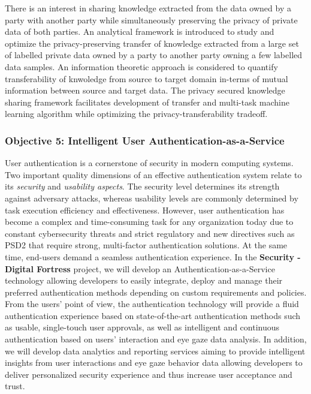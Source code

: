 \documentclass[a4paper,11pt]{article}
\newcommand{\project}[1]{\textbf{#1}\xspace}
\newcommand{\SECURITY}{\project{Security - Digital Fortress}}
\newcommand{\TheProject}{\SECURITY}
\begin{document}
There is an interest in sharing knowledge extracted from the data owned by a party with another party while simultaneously preserving the privacy of private data of both parties. An analytical framework is introduced to study and optimize the privacy-preserving transfer of knowledge extracted from a large set of labelled private data owned by a party to another party owning a few labelled data samples. An information theoretic approach is considered to quantify transferability of knwoledge from source to target domain in-terms of mutual information between source and target data. The privacy secured knowledge sharing framework facilitates development of transfer and multi-task machine learning algorithm while optimizing the privacy-transferability tradeoff.                



\subsubsection*{Objective 5: Intelligent User Authentication-as-a-Service}
\vspace{-6pt}

User authentication is a cornerstone of security in modern computing systems. Two important quality dimensions of an effective authentication system relate to its \textit{security} and \textit{usability aspects}. The security level determines its strength against adversary attacks, whereas usability levels are commonly determined by task execution efficiency and effectiveness. However, user authentication has become a complex and time-consuming task for any organization today due to constant cybersecurity threats and strict regulatory and new directives such as PSD2 that require strong, multi-factor authentication solutions. At the same time, end-users demand a seamless authentication experience. In the \TheProject{} project, we will develop an Authentication-as-a-Service technology allowing developers to easily integrate, deploy and manage their preferred authentication methods depending on custom requirements and policies. From the users’ point of view, the authentication technology will provide a fluid authentication experience based on state-of-the-art authentication methods such as usable, single-touch user approvals, as well as intelligent and continuous authentication based on users' interaction and eye gaze data analysis. In addition, we will develop data analytics and reporting services aiming to provide intelligent insights from user interactions and eye gaze behavior data allowing developers to deliver personalized security experience and thus increase user acceptance and trust.
\end{document}
